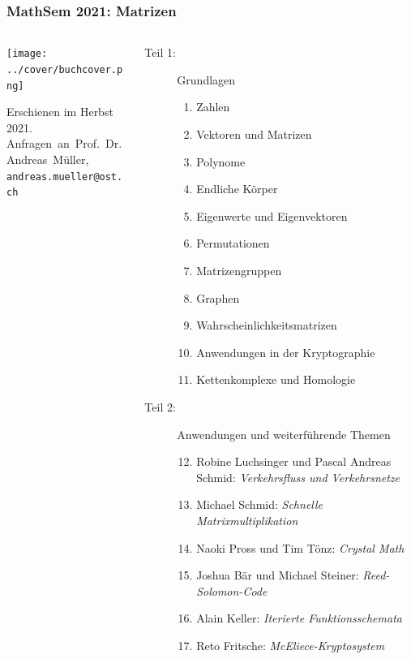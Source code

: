 \documentclass[handout]{beamer}
\title[]{}
\begin{document}
\begin{frame}
\frametitle{%
MathSem 2021: Matrizen}
\begin{columns}[t,onlytextwidth]
\begin{column}{0.32\textwidth}
\begin{center}
\texttt{[image: ../cover/buchcover.png]}
\end{center}
\vskip 0.2cm
\bigskip
\bigskip
Erschienen im Herbst 2021.\\
Anfragen~an~Prof.~Dr.~Andreas~Müller,\\
{\texttt{andreas.mueller@ost.ch}}
\bigskip
\bigskip
\bigskip
\end{column}
\begin{column}{0.65\textwidth}
\begin{description}
\item[Teil 1:] Grundlagen
\begin{enumerate}
\item Zahlen
\item Vektoren und Matrizen
\item Polynome
\item Endliche Körper
\item Eigenwerte und Eigenvektoren
\item Permutationen
\item Matrizengruppen
\item Graphen
\item Wahrscheinlichkeitsmatrizen
\item Anwendungen in der Kryptographie
\item Kettenkomplexe und Homologie
\end{enumerate}
\item[Teil 2:] Anwendungen und weiterführende Themen
\begin{enumerate}
\setcounter{enumi}{11}
\item Robine Luchsinger und Pascal Andreas Schmid: {\em Verkehrsfluss und Verkehrsnetze}
\item Michael Schmid: {\em Schnelle Matrixmultiplikation}
\item Naoki Pross und Tim Tönz: {\em Crystal Math}
\item Joshua Bär und Michael Steiner: {\em Reed-Solomon-Code}
\item Alain Keller: {\em Iterierte Funktionsschemata}
\item Reto Fritsche: {\em McEliece-Kryptosystem}

\end{enumerate}
\end{description}
\end{column}
\end{columns}
\end{frame}
\end{document}
